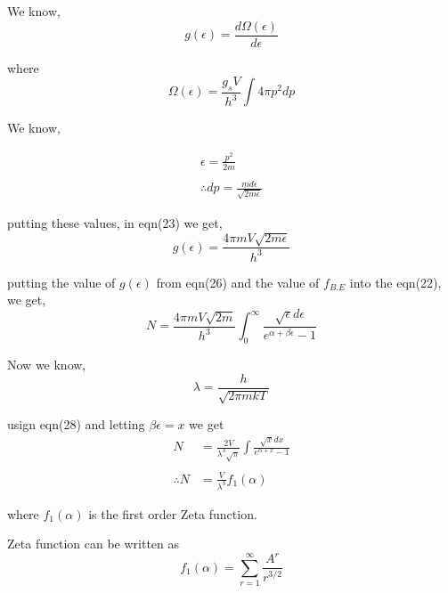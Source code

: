 \documentclass[12pt, letterpaper]{article}
\begin{document}
    We know, 
    \begin{equation}
        g(\epsilon) = \frac{d \Omega(\epsilon)}{d\epsilon}
    \end{equation}

    where
    \begin{equation}
        \Omega(\epsilon) = \frac{g_{s}V}{h^{3}} \int 4\pi p^{2} dp
    \end{equation}

    We know,

    \begin{equation}
    \begin{split}
        \epsilon = \frac{p^{2}}{2m}\\ 
        \\
        \therefore  dp = \frac{m d\epsilon}{\sqrt{2m\epsilon} }        
    \end{split}
    \end{equation}

    putting these values, in eqn(23) we get,
    \begin{equation}
        g(\epsilon) = \frac{4\pi m V\sqrt{2m\epsilon}}{h^{3}}
    \end{equation}

    putting the value of $g(\epsilon)$ from eqn(26) and the value of $f_{B.E}$ into the eqn(22), we get, 
    \begin{equation}
        N = \frac{4\pi m V\sqrt{2m}}{h^{3}} \int ^{\infty}_{0} \frac{\sqrt{\epsilon}d\epsilon}{e^{\alpha +  \beta \epsilon}-1}
    \end{equation}

    Now we know, 
    \begin{equation}
        \lambda = \frac{h}{\sqrt{2 \pi m k T}}
    \end{equation}

    usign eqn(28) and letting $\beta \epsilon = x$ we get 
    \begin{align}
        N & = \frac{2V}{\lambda^{3} \sqrt{\pi}} \int \frac{\sqrt{x} dx}{e^{\alpha +x}-1}\\
        \\
            \therefore N  & = \frac{V}{\lambda^{3} } f_{1}(\alpha)
    \end{align}

    where $f_{1}(\alpha)$ is the first order Zeta function.
    
    Zeta function can be written as 
    \begin{equation}
        f_{1}(\alpha) = \sum ^{\infty}_{r=1} \frac{A^{r}}{r^{3/2}} 
    \end{equation}
\end{document}
